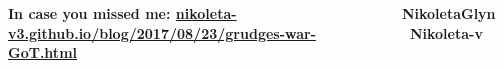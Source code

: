 \documentclass[usenames,dvipsnames,t]{beamer}
\begin{document}
\begin{frame}[fragile]
\begin{columns}
\begin{column}{.45\linewidth}
   \hspace{1cm}

\textbf{In case you missed me: \url{nikoleta-v3.github.io/blog/2017/08/23/grudges-war-GoT.html}
}
\end{column}
\begin{column}{.3\linewidth}

   \hspace{1cm}

\textbf{ \faTwitter \ NikoletaGlyn \ \faGithub \ Nikoleta-v 
}
\end{column}
\end{columns}

   \vspace{1cm}

\end{frame}
\end{document}
